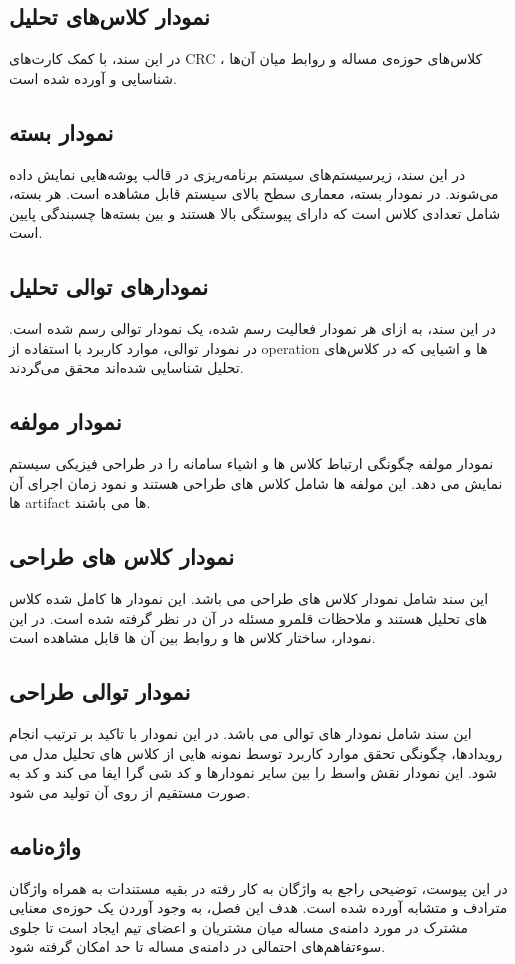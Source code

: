 \subsection{نمودار کلاس‌های تحلیل}
در این سند، با کمک  کارت‌های CRC ، کلاس‌های حوزه‌ی مساله و روابط میان آن‌ها شناسایی و آورده شده است.


\subsection{نمودار بسته}
در این سند، زیرسیستم‌های سیستم برنامه‌ریزی در قالب پوشه‌هایی نمایش داده می‌شوند. در نمودار بسته، معماری سطح بالای سیستم قابل مشاهده است. هر بسته، شامل تعدادی کلاس است که دارای پیوستگی
بالا هستند و بین بسته‌ها چسبندگی
پایین است.

\subsection{نمودارهای توالی تحلیل}
در این سند، به ازای هر نمودار فعالیت رسم شده، یک نمودار توالی رسم شده است. در نمودار توالی، موارد کاربرد با استفاده از operation ها و اشیایی که در کلاس‌های تحلیل شناسایی شده‌اند محقق می‌گردند.

\subsection{ نمودار مولفه}
نمودار مولفه چگونگی ارتباط کلاس ها و اشیاء سامانه را در طراحی فیزیکی سیستم نمایش می دهد. این مولفه ها شامل کلاس های طراحی هستند و نمود زمان اجرای آن ها artifact ها می باشند.
\subsection{نمودار کلاس های طراحی}
این سند شامل نمودار کلاس های طراحی می باشد. این نمودار ها کامل شده کلاس های تحلیل هستند و ملاحظات قلمرو مسئله در آن در نظر گرفته شده است. در این نمودار، ساختار کلاس ها  و روابط بین آن ها قابل مشاهده است.
\subsection{نمودار توالی طراحی}
این سند شامل نمودار های توالی می باشد. در این نمودار با تاکید بر ترتیب انجام رویدادها، چگونگی تحقق موارد کاربرد  توسط نمونه هایی از کلاس های تحلیل مدل می شود. این نمودار نقش واسط را بین سایر نمودارها و کد شی گرا ایفا می کند و کد به صورت مستقیم از روی آن تولید می شود.


\subsection{واژه‌نامه}
در این پیوست، توضیحی راجع به واژگان به کار رفته در بقیه مستندات به همراه واژگان مترادف و متشابه آورده شده است. هدف این فصل، به وجود آوردن یک حوزه‌ی معنایی مشترک در مورد دامنه‌ی مساله میان مشتریان و اعضای تیم ایجاد است  تا جلوی سوء‌تفاهم‌های احتمالی در دامنه‌ی مساله تا حد امکان گرفته شود.


